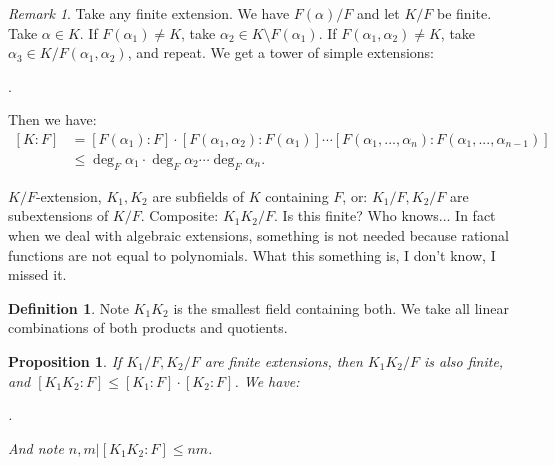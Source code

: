 \documentclass[9pt,reqno,twoside]{amsbook}
\theoremstyle{plain}
\numberwithin{section}{chapter}
\numberwithin{equation}{chapter}
\newtheorem{Prop}[theorem]{Proposition}
\theoremstyle{definition}
\newtheorem{Def}[theorem]{Definition}
\theoremstyle{remark}
\newtheorem{rem}[theorem]{Remark}
\theoremstyle{plain}
\newcommand{\bee}{\begin{equation}\begin{aligned}}
\newcommand{\eee}{\end{aligned}\end{equation}}
\renewcommand{\leq}{\leqslant}
\begin{document}
\begin{rem}
Take any finite extension. We have $F(\alpha)/F$ and let $K/F$ be finite. Take $\alpha \in K$. If $F(\alpha_1) \neq K$, take $\alpha_2 \in K\setminus F(\alpha_1)$. If $F(\alpha_1,\alpha_2) \neq K$, take $\alpha_3 \in K/F(\alpha_1,\alpha_2)$, and repeat. We get a tower of simple extensions:
\begin{center}
.
\end{center}

Then we have:
\bee
[K:F] &= [F(\alpha_1):F]\cdot [F(\alpha_1,\alpha_2):F(\alpha_1)] \cdots [F(\alpha_1,...,\alpha_n):F(\alpha_1,...,\alpha_{n - 1})]\\
&\leq \deg_F\alpha_1\cdot \deg_F\alpha_2\cdots\deg_F\alpha_n.
\eee
\end{rem}


$K/F$-extension, $K_1,K_2$ are subfields of $K$ containing $F$, or: $K_1/F,K_2/F$ are subextensions of $K/F$. Composite: $K_1K_2/F$. Is this finite? Who knows...
In fact when we deal with algebraic extensions, something is not needed because rational functions are not equal to polynomials. What this something is, I don't know, I missed it. 

\begin{Def}
Note $K_1K_2$ is the smallest field containing both. We take all linear combinations of both products and quotients. 

\end{Def}

\begin{Prop}
If $K_1/F,K_2/F$ are finite extensions, then $K_1K_2/F$ is also finite, and $[K_1K_2:F] \leq [K_1:F]\cdot [K_2:F]$. We have:
\begin{center}
.
\end{center}
And note $n,m|[K_1K_2:F] \leq nm$. 
\end{Prop}
\end{document}
